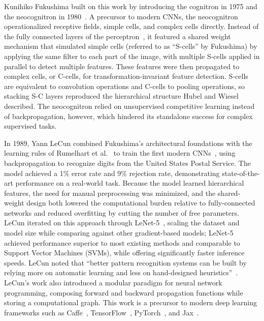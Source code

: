 Kunihiko Fukushima built on this work by introducing the cognitron in 1975 and the neocognitron in 1980~\cite{fukushima1975cognitron, fukushima1980neocognitron}. A precursor to modern CNNs, the neocognitron operationalized receptive fields, simple cells, and complex cells directly. Instead of the fully connected layers of the perceptron~\cite{rosenblatt1958perceptron}, it featured a shared weight mechanism that simulated simple cells (referred to as ``S-cells'' by Fukushima) by applying the same filter to each part of the image, with multiple S-cells applied in parallel to detect multiple features. These features were then propagated to complex cells, or C-cells, for transformation-invariant feature detection. S-cells are equivalent to convolution operations and C-cells to pooling operations, so stacking S-C layers reproduced the hierarchical structure Hubel and Wiesel described. The neocognitron relied on unsupervised competitive learning instead of backpropagation, however, which hindered its standalone success for complex supervised tasks.

In 1989, Yann LeCun combined Fukushima's architectural foundations with the learning rules of Rumelhart et al.~\cite{rumelhart1986learning} to train the first modern CNNs~\cite{lecun1989handwritten}, using backpropagation to recognize digits from the United States Postal Service. The model achieved a 1\% error rate and 9\% rejection rate, demonstrating state-of-the-art performance on a real-world task. Because the model learned hierarchical features, the need for manual preprocessing was minimized, and the shared-weight design both lowered the computational burden relative to fully-connected networks and reduced overfitting by cutting the number of free parameters. LeCun iterated on this approach through LeNet-5~\cite{lecun1998gradient}, scaling the dataset and model size while comparing against other gradient-based models; LeNet-5 achieved performance superior to most existing methods and comparable to Support Vector Machines (SVMs), while offering significantly faster inference speeds. LeCun noted that ``better pattern recognition systems can be built by relying more on automatic learning and less on hand-designed heuristics''~\cite{lecun1998gradient}. LeCun's work also introduced a modular paradigm for neural network programming, composing forward and backward propagation functions while storing a computational graph. This work is a precursor to modern deep learning frameworks such as Caffe~\cite{caffe}, TensorFlow~\cite{tensorflow2015-whitepaper}, PyTorch~\cite{paszke2019pytorch}, and Jax~\cite{jax2018github}.

